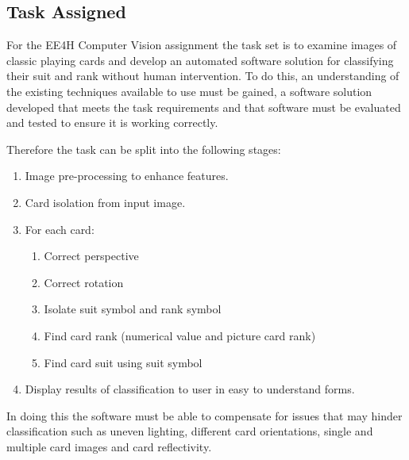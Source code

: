 	\subsection{Task Assigned}
		For the EE4H Computer Vision assignment the task set is to examine images of classic playing cards and develop an automated software solution for classifying their suit and rank without human intervention. To do this, an understanding of the existing techniques available to use must be gained, a software solution developed that meets the task requirements and that software must be evaluated and tested to ensure it is working correctly. 

		Therefore the task can be split into the following stages:

		\begin{enumerate}
			\item Image pre-processing to enhance features.
			\item Card isolation from input image.
			\item For each card:
			\begin{enumerate}
				\item Correct perspective
				\item Correct rotation
				\item Isolate suit symbol and rank symbol
				\item Find card rank (numerical value and picture card rank)
				\item Find card suit using suit symbol
			\end{enumerate}
			\item Display results of classification to user in easy to understand forms.
		\end{enumerate}

		In doing this the software must be able to compensate for issues that may hinder classification such as uneven lighting, different card orientations, single and multiple card images and card reflectivity.
